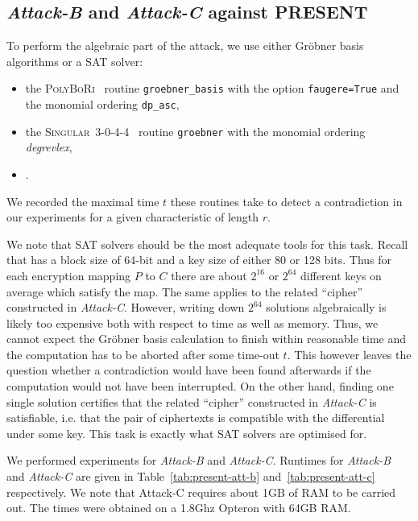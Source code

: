\subsection{\emph{Attack-B} and \emph{Attack-C} against PRESENT}
To perform the algebraic part of the attack, we use either Gröbner basis algorithms or a SAT solver: 
\begin{itemize}
 \item the \textsc{PolyBoRi}~\cite{polybori} routine \texttt{groebner\_basis} with the option \texttt{faugere=True} and the monomial ordering \texttt{dp\_asc},
 \item the \textsc{Singular}~3-0-4-4~\cite{singular} routine \texttt{groebner} with the monomial ordering \emph{degrevlex},
 \item \MiniSat \cite{minisat}.
\end{itemize}
We recorded the maximal time $t$ these routines take to detect a contradiction in our experiments for a given characteristic of length $r$.

We note that SAT solvers should be the most adequate tools for this task. Recall that \PRESENT has a block size of 64-bit and a key size of either 80 or 128 bits. Thus for each encryption mapping $P$ to $C$ there are about $2^{16}$ or $2^{64}$ different keys on average which satisfy the map. The same applies to the related ``cipher'' constructed in \emph{Attack-C}. However, writing down $2^{64}$ solutions algebraically is likely too expensive both with respect to time as well as memory. Thus, we cannot expect the Gröbner basis calculation to finish within reasonable time and the computation has to be aborted after some time-out $t$. This however leaves the question whether a contradiction would have been found afterwards if the computation would not have been interrupted. On the other hand, finding one single solution certifies that the related ``cipher'' constructed in \emph{Attack-C} is satisfiable, i.e. that the pair of ciphertexts is compatible with the differential under some key. This task is exactly what SAT solvers are optimised for.

We performed experiments for \emph{Attack-B} and \emph{Attack-C}. Runtimes for \emph{Attack-B} and \emph{Attack-C} are given in
Table~\ref{tab:present-att-b} and~\ref{tab:present-att-c} respectively. We note that Attack-C requires about 1GB of RAM to be carried out.
The times were obtained on a 1.8Ghz Opteron with 64GB RAM.

